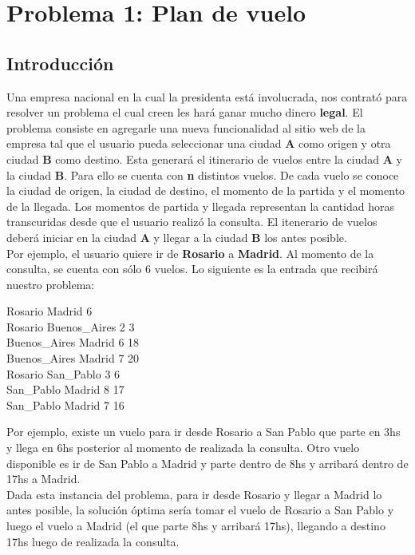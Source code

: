 \section{Problema 1: Plan de vuelo}

\subsection{Introducci\'on}
Una empresa nacional en la cual la presidenta está involucrada, nos contrató para resolver un problema el cual creen les hará ganar mucho dinero \textbf{legal}.
El problema consiste en agregarle una nueva funcionalidad al sitio web de la empresa tal que el usuario pueda seleccionar 
una ciudad \textbf{A} como origen y otra ciudad \textbf{B} como destino. Esta generará el itinerario de vuelos entre 
la ciudad \textbf{A} y la ciudad \textbf{B}. Para ello se cuenta con \textbf{n} distintos vuelos. De cada vuelo se conoce la ciudad de origen, la ciudad de destino, el momento de la partida y el momento de la llegada. Los momentos de partida y llegada representan la cantidad horas transcuridas desde que el usuario
realizó la consulta. El itenerario de vuelos deberá iniciar en la ciudad \textbf{A} y llegar a la ciudad \textbf{B} los antes posible.\\

Por ejemplo, el usuario quiere ir de \textbf{Rosario} a \textbf{Madrid}. Al momento de la consulta, se cuenta con sólo 6 vuelos. 
Lo siguiente es la entrada que recibirá nuestro problema:

\begin{codebox}
Rosario Madrid 6\\
Rosario Buenos\_Aires 2 3\\
Buenos\_Aires Madrid 6 18\\
Buenos\_Aires Madrid 7 20\\
Rosario San\_Pablo 3 6\\
San\_Pablo Madrid 8 17\\
San\_Pablo Madrid 7 16
\end{codebox}

Por ejemplo, existe un vuelo para ir desde Rosario a San Pablo que parte en 3hs y llega en 6hs posterior al momento de realizada la consulta. Otro vuelo disponible es ir de San Pablo a Madrid y parte dentro de 8hs y arribará dentro de 17hs a Madrid.\\

Dada esta instancia del problema, para ir desde Rosario y llegar a Madrid lo antes posible, la solución óptima sería tomar el vuelo de Rosario a San Pablo y luego el vuelo a Madrid (el que parte 8hs y arribará 17hs), llegando a destino 17hs luego de realizada la consulta. \\

